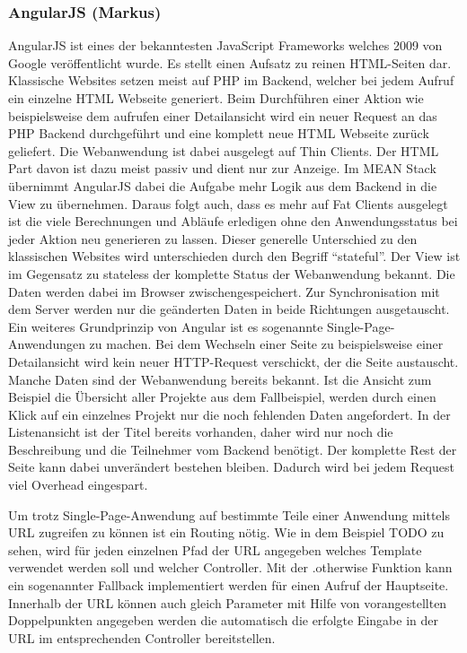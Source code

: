 \subsubsection{AngularJS (Markus)}\label{angularjs-markus}

AngularJS ist eines der bekanntesten JavaScript Frameworks welches 2009
von Google veröffentlicht wurde. Es stellt einen Aufsatz zu reinen
HTML-Seiten dar. Klassische Websites setzen meist auf PHP im Backend,
welcher bei jedem Aufruf ein einzelne HTML Webseite generiert. Beim
Durchführen einer Aktion wie beispielsweise dem aufrufen einer
Detailansicht wird ein neuer Request an das PHP Backend durchgeführt und
eine komplett neue HTML Webseite zurück geliefert. Die Webanwendung ist
dabei ausgelegt auf Thin Clients. Der HTML Part davon ist dazu meist
passiv und dient nur zur Anzeige. Im MEAN Stack übernimmt AngularJS
dabei die Aufgabe mehr Logik aus dem Backend in die View zu übernehmen.
Daraus folgt auch, dass es mehr auf Fat Clients ausgelegt ist die viele
Berechnungen und Abläufe erledigen ohne den Anwendungsstatus bei jeder
Aktion neu generieren zu lassen. Dieser generelle Unterschied zu den
klassischen Websites wird unterschieden durch den Begriff ``stateful''.
Der View ist im Gegensatz zu stateless der komplette Status der
Webanwendung bekannt. Die Daten werden dabei im Browser
zwischengespeichert. Zur Synchronisation mit dem Server werden nur die
geänderten Daten in beide Richtungen ausgetauscht. Ein weiteres
Grundprinzip von Angular ist es sogenannte Single-Page-Anwendungen zu
machen. Bei dem Wechseln einer Seite zu beispielsweise einer
Detailansicht wird kein neuer HTTP-Request verschickt, der die Seite
austauscht. Manche Daten sind der Webanwendung bereits bekannt. Ist die
Ansicht zum Beispiel die Übersicht aller Projekte aus dem Fallbeispiel,
werden durch einen Klick auf ein einzelnes Projekt nur die noch
fehlenden Daten angefordert. In der Listenansicht ist der Titel bereits
vorhanden, daher wird nur noch die Beschreibung und die Teilnehmer vom
Backend benötigt. Der komplette Rest der Seite kann dabei unverändert
bestehen bleiben. Dadurch wird bei jedem Request viel Overhead
eingespart.

Um trotz Single-Page-Anwendung auf bestimmte Teile einer Anwendung
mittels URL zugreifen zu können ist ein Routing nötig. Wie in dem
Beispiel TODO zu sehen, wird für jeden einzelnen Pfad der URL angegeben
welches Template verwendet werden soll und welcher Controller. Mit der
.otherwise Funktion kann ein sogenannter Fallback implementiert werden
für einen Aufruf der Hauptseite. Innerhalb der URL können auch gleich
Parameter mit Hilfe von vorangestellten Doppelpunkten angegeben werden
die automatisch die erfolgte Eingabe in der URL im entsprechenden
Controller bereitstellen.

